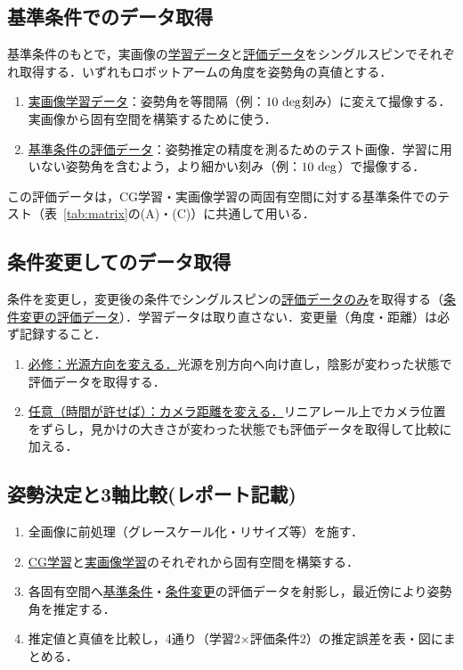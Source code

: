 \documentclass{article}
\begin{document}
\subsection{基準条件でのデータ取得}
基準条件のもとで，実画像の\uline{学習データ}と\uline{評価データ}をシングルスピンでそれぞれ取得する．いずれもロボットアームの角度を姿勢角の真値とする．
\begin{enumerate}
\item \uline{実画像学習データ}：姿勢角を等間隔（例：$10~{\rm deg}$刻み）に変えて撮像する．実画像から固有空間を構築するために使う．
\item \uline{基準条件の評価データ}：姿勢推定の精度を測るためのテスト画像．学習に用いない姿勢角を含むよう，より細かい刻み（例：$10~{\rm deg}$）で撮像する．
\end{enumerate}
この評価データは，CG学習・実画像学習の両固有空間に対する基準条件でのテスト（表~\ref{tab:matrix}の(A)・(C)）に共通して用いる．

\subsection{条件変更してのデータ取得}
条件を変更し，変更後の条件でシングルスピンの\uline{評価データのみ}を取得する（\uline{条件変更の評価データ}）．学習データは取り直さない．変更量（角度・距離）は必ず記録すること．
\begin{enumerate}
\item \uline{必修：光源方向を変える．}光源を別方向へ向け直し，陰影が変わった状態で評価データを取得する．
\item \uline{任意（時間が許せば）：カメラ距離を変える．}リニアレール上でカメラ位置をずらし，見かけの大きさが変わった状態でも評価データを取得して比較に加える．
\end{enumerate}

\subsection{姿勢決定と3軸比較(レポート記載)}
\begin{enumerate}
\item 全画像に前処理（グレースケール化・リサイズ等）を施す．
\item \uline{CG学習}と\uline{実画像学習}のそれぞれから固有空間を構築する．
\item 各固有空間へ\uline{基準条件}・\uline{条件変更}の評価データを射影し，最近傍により姿勢角を推定する．
\item 推定値と真値を比較し，4通り（学習2$\times$評価条件2）の推定誤差を表・図にまとめる．
\end{enumerate}
\end{document}
